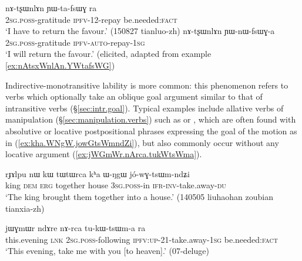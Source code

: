 \begin{exe}
\ex 
\begin{xlist}
\ex \label{ex:nAtsxWnlAn.YWtafsWG}
\gll  nɤ-tʂɯnlɤn ɲɯ-ta-fsɯɣ ra \\
\textsc{2sg}.\textsc{poss}-gratitude \textsc{ipfv}-1\fl{}2-repay be.needed:\textsc{fact} \\
\glt `I have to return the favour.' (150827 tianluo-zh) 
\ex \label{ex:nAtsxWnlAn.YWnWfsWGa}
\gll nɤ-tʂɯnlɤn ɲɯ-nɯ-fsɯɣ-a \\
\textsc{2sg}.\textsc{poss}-gratitude \textsc{ipfv}-\textsc{auto}-repay-\textsc{1sg} \\
\glt `I will return the favour.' (elicited, adapted from example \ref{ex:nAtsxWnlAn.YWtafsWG})
\end{xlist}
\end{exe}

Indirective-monotransitive lability is more common:  this phenomenon refers to verbs which optionally take an oblique goal argument similar to that of intransitive verbs (§\ref{sec:intr.goal}). Typical examples include allative verbs of manipulation (§\ref{sec:manipulation.verbs}) such as  or , which are often found with absolutive or locative postpositional phrases expressing the goal of the motion as in (\ref{ex:kha.WNgW.jowGtsWmndZi}), but also commonly occur without any locative argument (\ref{ex:jWGmWr.nArca.tukWtsWma}).
 
 \begin{exe}
\ex \label{ex:kha.WNgW.jowGtsWmndZi}
\gll rɟɤlpu nɯ kɯ tɯtɯrca kʰa ɯ-ŋgɯ jó-wɣ-tsɯm-ndʑi  \\
king \textsc{dem} \textsc{erg} together house \textsc{3sg}.\textsc{poss}-in \textsc{ifr}-\textsc{inv}-take.away-\textsc{du} \\
\glt `The king brought them together into a house.' (140505 liuhaohan zoubian tianxia-zh)
\end{exe}

\begin{exe}
\ex \label{ex:jWGmWr.nArca.tukWtsWma}
\gll jɯɣmɯr ndɤre nɤ-rca tu-kɯ-tsɯm-a ra \\
this.evening \textsc{lnk} \textsc{2sg}.\textsc{poss}-following \textsc{ipfv}:\textsc{up}-2\fl {}1-take.away-\textsc{1sg} be.needed:\textsc{fact} \\
\glt `This evening, take me with you [to heaven].' (07-deluge) 	
\end{exe}

